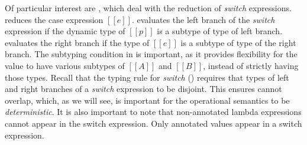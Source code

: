 Of particular interest are
, which deal with the reduction
of \emph{switch} expressions.
 reduces the case expression $[[e]]$.
 evaluates
the left branch of the \emph{switch} expression if the dynamic type of $[[p]]$ is
a subtype of type of left branch.  evaluates the right
branch if the type of $[[e]]$ is a subtype
of type of the right branch. The subtyping condition in
 is important, as it provides
flexibility for the value to have various subtypes of $[[A]]$ and $[[B]]$, instead
of strictly having those types. Recall that
the typing rule for \emph{switch} () requires that
types of left and right branches of a \emph{switch}
expression to be disjoint.
This ensures  cannot overlap, which, as we will
see, is important for the
operational semantics to be \textit{deterministic}.
It is also important to note that non-annotated lambda expressions cannot appear
in the switch expression. Only annotated values appear in a switch expression.



\begin{comment}
\paragraph{Dynamic Type} The dynamic semantics employs a simple
function that retrieves the dynamic type of a pre-value.
The definition is shown in the lower part of \Cref{fig:union:os}.
$[[Int]]$ is returned when $[[p]]$ is an integer $[[i]]$.
Otherwise, for functions, the function annotation $[[A -> B]]$ is returned.
\end{comment}



